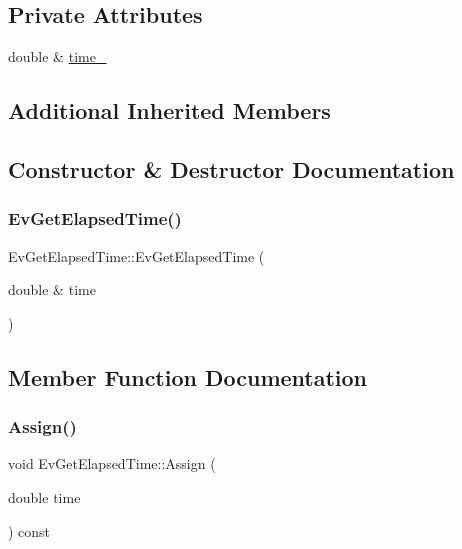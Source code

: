 \subsection*{Private Attributes}
\begin{DoxyCompactItemize}
\item 
double \& \mbox{\hyperlink{struct_ev_get_elapsed_time_ad4833ace67fda7df70233c80ca3a24a7}{time\+\_\+}}
\end{DoxyCompactItemize}
\subsection*{Additional Inherited Members}


\subsection{Constructor \& Destructor Documentation}
\mbox{\label{struct_ev_get_elapsed_time_aaca1cea5f70b2a47ffcdd96424a7735c}} 
\subsubsection{\texorpdfstring{Ev\+Get\+Elapsed\+Time()}{EvGetElapsedTime()}}
{\footnotesize\ttfamily Ev\+Get\+Elapsed\+Time\+::\+Ev\+Get\+Elapsed\+Time (\begin{DoxyParamCaption}\item[{double \&}]{time }\end{DoxyParamCaption})\hspace{0.3cm}{\ttfamily [inline]}}



\subsection{Member Function Documentation}
\mbox{\label{struct_ev_get_elapsed_time_aa0381285a0151abbc5e8a57d088cc394}} 
\subsubsection{\texorpdfstring{Assign()}{Assign()}}
{\footnotesize\ttfamily void Ev\+Get\+Elapsed\+Time\+::\+Assign (\begin{DoxyParamCaption}\item[{double}]{time }\end{DoxyParamCaption}) const\hspace{0.3cm}{\ttfamily [inline]}}

